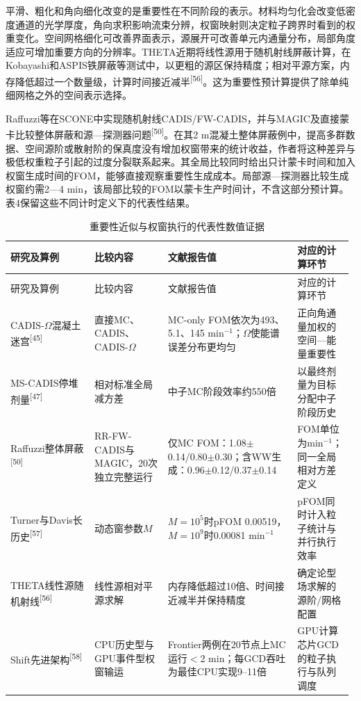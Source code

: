 \documentclass[UTF8, zihao=-4, fontset=none, a4paper]{ctexart}
\newcommand{\upcite}[1]{\textsuperscript{[#1]}}
\begin{document}
平滑、粗化和角向细化改变的是重要性在不同阶段的表示。材料均匀化会改变低密度通道的光学厚度，角向求积影响流束分辨，权窗映射则决定粒子跨界时看到的权重变化。空间网格细化可改善界面表示，源展开可改善单元内通量分布，局部角度适应可增加重要方向的分辨率。THETA近期将线性源用于随机射线屏蔽计算，在Kobayashi和ASPIS铁屏蔽等测试中，以更粗的源区保持精度；相对平源方案，内存降低超过一个数量级，计算时间接近减半\upcite{56}。这为重要性预计算提供了除单纯细网格之外的空间表示选择。

Raffuzzi等在SCONE中实现随机射线CADIS/FW-CADIS，并与MAGIC及直接蒙卡比较整体屏蔽和源---探测器问题\upcite{50}。在其2 m混凝土整体屏蔽例中，提高多群数据、空间源阶或散射阶的保真度没有增加权窗带来的统计收益，作者将这种差异与极低权重粒子引起的过度分裂联系起来。其全局比较同时给出只计蒙卡时间和加入权窗生成时间的FOM，能够直接观察重要性生成成本。局部源---探测器比较生成权窗约需2---4 min，该局部比较的FOM以蒙卡生产时间计，不含这部分预计算。表4保留这些不同计时定义下的代表性结果。 \begin{longtable}{@{}>{\raggedright\arraybackslash}p{0.24\linewidth}>{\raggedright\arraybackslash}p{0.21\linewidth}>{\raggedright\arraybackslash}p{0.37\linewidth}>{\raggedright\arraybackslash}p{0.16\linewidth}@{}}
\caption{重要性近似与权窗执行的代表性数值证据}\label{tab:4}\\
\toprule
研究及算例 & 比较内容 & 文献报告值 & 对应的计算环节 \\
\midrule
\endfirsthead
\toprule
研究及算例 & 比较内容 & 文献报告值 & 对应的计算环节 \\
\midrule
\endhead
\bottomrule
\endlastfoot
CADIS-$\Omega$混凝土迷宫\upcite{45} & 直接MC、CADIS、CADIS-$\Omega$ & MC-only FOM依次为493、5.1、145 min$^{-1}$；$\Omega$使能谱误差分布更均匀 & 正向角通量加权的空间—能量重要性 \\
MS-CADIS停堆剂量\upcite{47} & 相对标准全局减方差 & 中子MC阶段效率约550倍 & 以最终剂量为目标分配中子阶段历史 \\
Raffuzzi整体屏蔽\upcite{50} & RR-FW-CADIS与MAGIC，20次独立完整运行 & 仅MC FOM：1.08$\pm$0.14/0.80$\pm$0.30；含WW生成：0.96$\pm$0.12/0.37$\pm$0.14 & FOM单位为min$^{-1}$；同一全局相对方差定义 \\
Turner与Davis长历史\upcite{57} & 动态窗参数$M$ & $M=10^{5}$时pFOM 0.00519，$M=10^{9}$时0.00081 min$^{-1}$ & pFOM同时计入粒子统计与并行执行效率 \\
THETA线性源随机射线\upcite{56} & 线性源相对平源求解 & 内存降低超过10倍、时间接近减半并保持精度 & 确定论型场求解的源阶/网格配置 \\
Shift先进架构\upcite{58} & CPU历史型与GPU事件型权窗输运 & Frontier两例在20节点上MC运行$<$2 min；每GCD吞吐为最佳CPU实现9--11倍 & GPU计算芯片GCD的粒子执行与队列调度 \\
\end{longtable}
\end{document}
